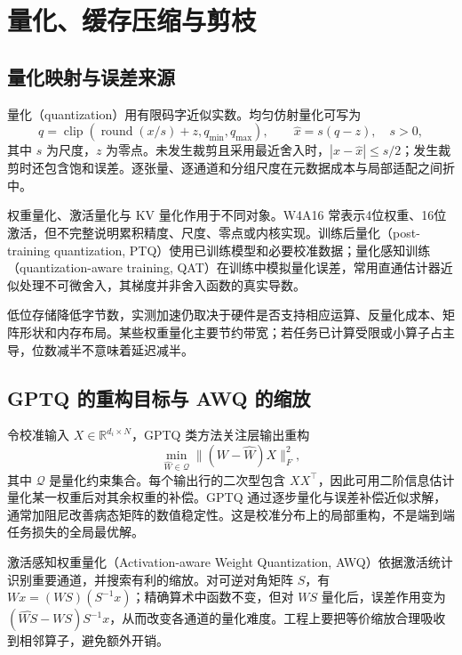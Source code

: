 \setcounter{chapter}{23} %
\chapter{量化、缓存压缩与剪枝}
\label{ch:quantization}

\section{量化映射与误差来源}

量化（quantization）用有限码字近似实数。均匀仿射量化可写为
\begin{equation}
q=\operatorname{clip}\!\left(\operatorname{round}(x/s)+z,q_{\min},q_{\max}\right),\qquad
\widehat x=s(q-z),\quad s>0,
\label{eq:quantization}
\end{equation}
其中 $s$ 为尺度，$z$ 为零点。未发生裁剪且采用最近舍入时，$|x-\widehat x|\le s/2$；发生裁剪时还包含饱和误差。逐张量、逐通道和分组尺度在元数据成本与局部适配之间折中。

权重量化、激活量化与 KV 量化作用于不同对象。W4A16 常表示4位权重、16位激活，但不完整说明累积精度、尺度、零点或内核实现。训练后量化（post-training quantization, PTQ）使用已训练模型和必要校准数据；量化感知训练（quantization-aware training, QAT）在训练中模拟量化误差，常用直通估计器近似处理不可微舍入，其梯度并非舍入函数的真实导数。

低位存储降低字节数，实测加速仍取决于硬件是否支持相应运算、反量化成本、矩阵形状和内存布局。某些权重量化主要节约带宽；若任务已计算受限或小算子占主导，位数减半不意味着延迟减半。

\section{GPTQ 的重构目标与 AWQ 的缩放}

令校准输入 $X\in\mathbb R^{d_i\times N}$，GPTQ 类方法关注层输出重构
\[
\min_{\widehat W\in\mathcal Q}\|(W-\widehat W)X\|_F^2,
\]
其中 $\mathcal Q$ 是量化约束集合。每个输出行的二次型包含 $XX^\top$，因此可用二阶信息估计量化某一权重后对其余权重的补偿。GPTQ 通过逐步量化与误差补偿近似求解，通常加阻尼改善病态矩阵的数值稳定性\cite{gptq}。这是校准分布上的局部重构，不是端到端任务损失的全局最优解。

激活感知权重量化（Activation-aware Weight Quantization, AWQ）依据激活统计识别重要通道，并搜索有利的缩放\cite{awq}。对可逆对角矩阵 $S$，有 $Wx=(WS)(S^{-1}x)$；精确算术中函数不变，但对 $WS$ 量化后，误差作用变为 $(\widehat{WS}-WS)S^{-1}x$，从而改变各通道的量化难度。工程上要把等价缩放合理吸收到相邻算子，避免额外开销。

